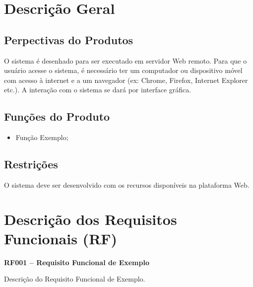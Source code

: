 \documentclass[notitlepage, draft]{article}
\begin{document}
    \newpage
    
    \section{Descrição Geral}
    
        \subsection{Perpectivas do Produtos}
             O sistema é desenhado para ser executado em servidor Web remoto. Para que o usuário acesse o sistema, é necessário ter um computador ou dispositivo móvel com acesso à internet e a um navegador (ex: Chrome, Firefox, Internet Explorer etc.). A interação com o sistema se dará por interface gráfica.
    
        \subsection{Funções do Produto}
            \begin{itemize}
                    \item Função Exemplo;
            \end{itemize}
    
        \subsection{Restrições}
            O sistema deve ser desenvolvido com os recursos disponíveis na plataforma Web.
    
    \newpage
    
    \section{Descrição dos Requisitos Funcionais (RF)}
    
        \begin{table}[H] %
        
            \begin{tcolorbox}
                \textbf{RF001 – Requisito Funcional de Exemplo}
            \end{tcolorbox}
    
            \quad Descrição do Requisito Funcional de Exemplo.
        \end{table}
        
\end{document}
